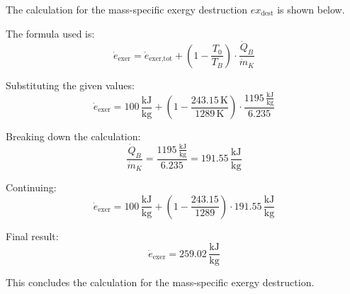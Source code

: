 The calculation for the mass-specific exergy destruction \( ex_{\text{dest}} \) is shown below.  

The formula used is:  
\[
\dot{e}_{\text{exer}} = \dot{e}_{\text{exer,tot}} + \left( 1 - \frac{T_0}{T_B} \right) \cdot \frac{\dot{Q}_B}{\dot{m}_K}
\]  

Substituting the given values:  
\[
\dot{e}_{\text{exer}} = 100 \, \frac{\text{kJ}}{\text{kg}} + \left( 1 - \frac{243.15 \, \text{K}}{1289 \, \text{K}} \right) \cdot \frac{1195 \, \frac{\text{kJ}}{\text{kg}}}{6.235}
\]  

Breaking down the calculation:  
\[
\frac{\dot{Q}_B}{\dot{m}_K} = \frac{1195 \, \frac{\text{kJ}}{\text{kg}}}{6.235} = 191.55 \, \frac{\text{kJ}}{\text{kg}}
\]  

Continuing:  
\[
\dot{e}_{\text{exer}} = 100 \, \frac{\text{kJ}}{\text{kg}} + \left( 1 - \frac{243.15}{1289} \right) \cdot 191.55 \, \frac{\text{kJ}}{\text{kg}}
\]  

Final result:  
\[
\dot{e}_{\text{exer}} = 259.02 \, \frac{\text{kJ}}{\text{kg}}
\]  

This concludes the calculation for the mass-specific exergy destruction.